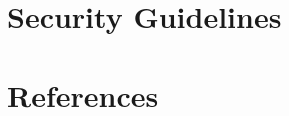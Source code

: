 \documentclass[twoside]{book}
\makeatletter
\newcommand{\+}{\discretionary{\mbox{\scriptsize$\hookleftarrow$}}{}{}}
\renewcommand{\paragraph}{%
  \@startsection{paragraph}{4}{0ex}{-1.0ex}{1.0ex}{%
    \normalfont\normalsize\bfseries\SS@parafont%
  }%
}
\let\oldsection\section
\let\oldsubsection\subsection
\let\oldsubsubsection\subsubsection
\newcommand\mysection\oldsubsection
\newcommand\mysubsection\oldsubsubsection
\newcommand\mysubsubsection\paragraph
\newcommand\shiftleveldown{%
\makeatletter%
\renewcommand{\section}{\mysection}%
\renewcommand{\subsection}{\mysubsection}%
\renewcommand{\subsubsection}{\mysubsubsection}%
\makeatother%
}
\newcommand\restorelevel{%
\makeatletter%
\renewcommand{\section}{\oldsection}%
\renewcommand{\subsection}{\oldsubsection}%
\renewcommand{\subsubsection}{\oldsubsubsection}%
\makeatother%
}
\makeatother
\begin{document}

\shiftleveldown



\restorelevel




\chapter{Security Guidelines}
\label{_p_c_i_g_u_i_d_a_n_c_e}
\hypertarget{_p_c_i_g_u_i_d_a_n_c_e}{}


\chapter{References}
\label{_r_e_f_e_r_e_n_c_e_s}
\hypertarget{_r_e_f_e_r_e_n_c_e_s}{}



\printindex
\end{document}
